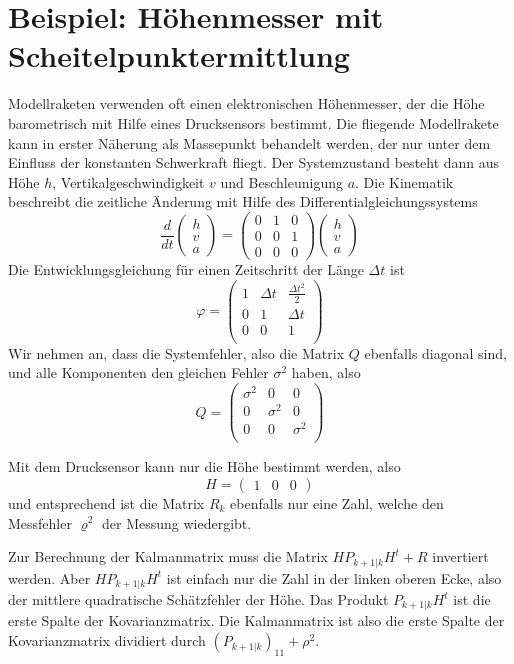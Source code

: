 \section{Beispiel: Höhenmesser mit Scheitelpunktermittlung}
Modellraketen verwenden oft einen elektronischen Höhenmesser, der die Höhe
barometrisch mit Hilfe eines Drucksensors bestimmt.
Die fliegende Modellrakete
kann in erster Näherung als Massepunkt behandelt werden, der nur unter dem
Einfluss der konstanten Schwerkraft fliegt.
Der Systemzustand besteht
dann aus Höhe $h$, Vertikalgeschwindigkeit $v$ und Beschleunigung $a$.
Die Kinematik beschreibt die zeitliche Änderung mit Hilfe des
Differentialgleichungssystems
\[
\frac{d}{dt}
\begin{pmatrix}
h\\v\\a
\end{pmatrix}
=
\begin{pmatrix}
0&1&0\\
0&0&1\\
0&0&0
\end{pmatrix}
\begin{pmatrix}
h\\v\\a
\end{pmatrix}
\]
Die Entwicklungsgleichung für einen Zeitschritt der Länge $\Delta t$ ist
\[
\varphi=\begin{pmatrix}
1&\Delta t&\frac{\Delta t^2}2\\
0&1&\Delta t\\
0&0&1\\
\end{pmatrix}
\]
Wir nehmen an, dass die Systemfehler, also die Matrix $Q$ ebenfalls diagonal sind,
und alle Komponenten den gleichen Fehler $\sigma^2$ haben, also
\[
Q=\begin{pmatrix}
\sigma^2&0&0\\
0&\sigma^2&0\\
0&0&\sigma^2\\
\end{pmatrix}
\]

Mit dem Drucksensor kann nur die Höhe bestimmt werden, also
\[
H=\begin{pmatrix}1&0&0\end{pmatrix}
\]
und entsprechend ist die Matrix $R_k$ ebenfalls nur eine Zahl, welche
den Messfehler $\varrho^2$ der Messung wiedergibt.

Zur Berechnung der Kalmanmatrix muss die Matrix $HP_{k+1|k}H^t+R$ invertiert werden.
Aber $HP_{k+1|k}H^t$ ist einfach nur die Zahl in der linken oberen Ecke, also
der mittlere quadratische Schätzfehler der Höhe.
Das Produkt $P_{k+1|k}H^t$
ist die erste Spalte der Kovarianzmatrix.
Die Kalmanmatrix ist also die erste
Spalte der Kovarianzmatrix dividiert durch $(P_{k+1|k})_{11}+\rho^2$.

